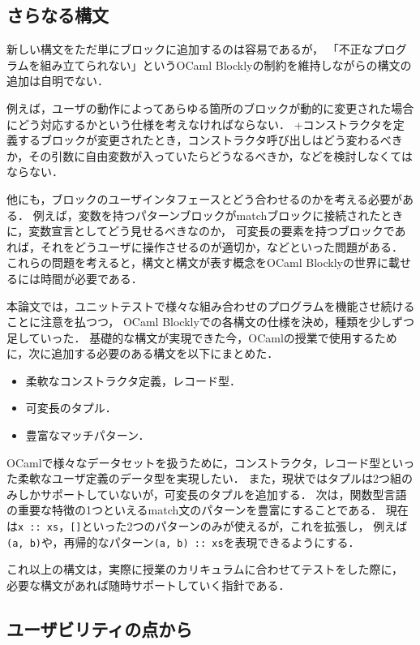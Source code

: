 \subsection*{さらなる構文}

新しい構文をただ単にブロックに追加するのは容易であるが，
「不正なプログラムを組み立てられない」というOCaml Blocklyの制約を維持しながらの構文の追加は自明でない．

例えば，ユーザの動作によってあらゆる箇所のブロックが動的に変更された場合にどう対応するかという仕様を考えなければならない．
+コンストラクタを定義するブロックが変更されたとき，コンストラクタ呼び出しはどう変わるべきか，その引数に自由変数が入っていたらどうなるべきか，などを検討しなくてはならない． %

他にも，ブロックのユーザインタフェースとどう合わせるのかを考える必要がある．
例えば，変数を持つパターンブロックがmatchブロックに接続されたときに，変数宣言としてどう見せるべきなのか，
可変長の要素を持つブロックであれば，それをどうユーザに操作させるのが適切か，などといった問題がある．
これらの問題を考えると，構文と構文が表す概念をOCaml Blocklyの世界に載せるには時間が必要である．

本論文では，ユニットテストで様々な組み合わせのプログラムを機能させ続けることに注意を払つつ，
OCaml Blocklyでの各構文の仕様を決め，種類を少しずつ足していった．
基礎的な構文が実現できた今，OCamlの授業で使用するために，次に追加する必要のある構文を以下にまとめた．

\begin{itemize}
  \item 柔軟なコンストラクタ定義，レコード型．
  \item 可変長のタプル．
  \item 豊富なマッチパターン．
\end{itemize}

OCamlで様々なデータセットを扱うために，コンストラクタ，レコード型といった柔軟なユーザ定義のデータ型を実現したい．
また，現状ではタプルは2つ組のみしかサポートしていないが，可変長のタプルを追加する．
次は，関数型言語の重要な特徴の1つといえるmatch文のパターンを豊富にすることである．
現在は{\tt x ::\ xs}，{\tt []}といった2つのパターンのみが使えるが，これを拡張し，
例えば{\tt (a, b)}や，再帰的なパターン{\tt (a, b) ::\ xs}を表現できるようにする．

これ以上の構文は，実際に授業のカリキュラムに合わせてテストをした際に，
必要な構文があれば随時サポートしていく指針である．

\subsection*{ユーザビリティの点から}

